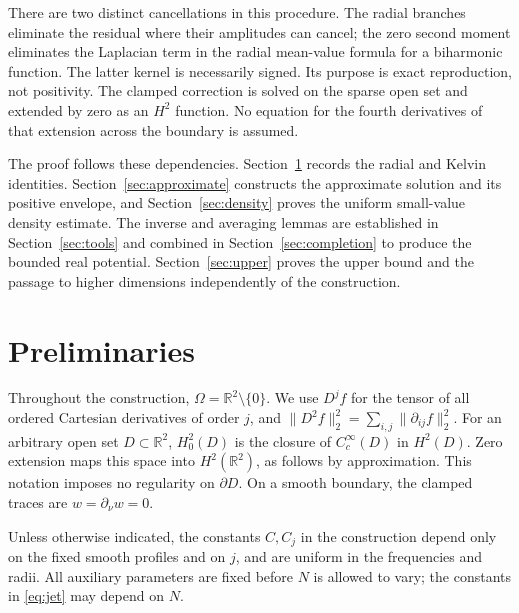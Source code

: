 \documentclass[11pt,twoside,leqno]{article}
\numberwithin{equation}{section}
\theoremstyle{definition}
\theoremstyle{remark}
\newcommand{\R}{\mathbb R}
\newcommand{\Om}{\Omega}
\begin{document}
There are two distinct cancellations in this procedure. The radial
branches eliminate the residual where their amplitudes can cancel;
the zero second moment eliminates the Laplacian term in the radial
mean-value formula for a biharmonic function. The latter kernel is
necessarily signed. Its purpose is exact reproduction, not positivity.
The clamped correction is solved on the sparse open set and extended
by zero as an $H^2$ function. No equation for the fourth derivatives of
that extension across the boundary is assumed.

The proof follows these dependencies. Section~\ref{sec:preliminaries}
records the radial and Kelvin identities.
Section~\ref{sec:approximate} constructs the approximate solution and
its positive envelope, and Section~\ref{sec:density} proves the
uniform small-value density estimate. The inverse and averaging lemmas
are established in Section~\ref{sec:tools} and combined in
Section~\ref{sec:completion} to produce the bounded real potential.
Section~\ref{sec:upper} proves the upper bound and the passage to
higher dimensions independently of the construction.

\section{Preliminaries}\label{sec:preliminaries}

Throughout the construction, $\Om=\R^2\setminus\{0\}$.
We use $D^jf$ for the tensor of all ordered Cartesian derivatives of
order $j$, and
$\|D^2f\|_2^2=\sum_{i,j}\|\partial_{ij}f\|_2^2$.
For an arbitrary open set $D\subset\R^2$,
$H^2_0(D)$ is the closure of $C_c^\infty(D)$ in $H^2(D)$.
Zero extension maps this space into $H^2(\R^2)$, as follows by
approximation. This notation imposes no regularity on $\partial D$.
On a smooth boundary, the clamped traces are $w=\partial_\nu w=0$.

Unless otherwise indicated, the constants $C,C_j$ in the construction
depend only on the fixed smooth profiles and on $j$, and are uniform
in the frequencies and radii. All auxiliary parameters are fixed before
$N$ is allowed to vary; the constants in \eqref{eq:jet} may depend on
$N$.
\end{document}
